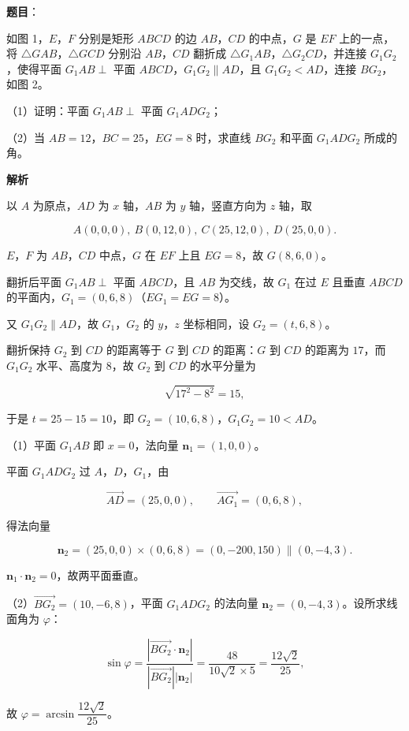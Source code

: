 \begin{answer}

\textbf{题目}：

如图 1，$E$，$F$ 分别是矩形 $ABCD$ 的边 $AB$，$CD$ 的中点，$G$ 是 $EF$ 上的一点，将 $\triangle GAB$，$\triangle GCD$ 分别沿 $AB$，$CD$ 翻折成 $\triangle G_1AB$，$\triangle G_2CD$，并连接 $G_1G_2$，使得平面 $G_1AB\perp$ 平面 $ABCD$，$G_1G_2\parallel AD$，且 $G_1G_2<AD$，连接 $BG_2$，如图 2。

（1）证明：平面 $G_1AB\perp$ 平面 $G_1ADG_2$；

（2）当 $AB=12$，$BC=25$，$EG=8$ 时，求直线 $BG_2$ 和平面 $G_1ADG_2$ 所成的角。
\nopagebreak[4]
\begin{center}\end{center}
\nopagebreak[4]
\textbf{解析}

以 $A$ 为原点，$AD$ 为 $x$ 轴，$AB$ 为 $y$ 轴，竖直方向为 $z$ 轴，取

\nopagebreak[4]
\[A(0,0,0),\ B(0,12,0),\ C(25,12,0),\ D(25,0,0).\]

$E$，$F$ 为 $AB$，$CD$ 中点，$G$ 在 $EF$ 上且 $EG=8$，故 $G(8,6,0)$。

翻折后平面 $G_1AB\perp$ 平面 $ABCD$，且 $AB$ 为交线，故 $G_1$ 在过 $E$ 且垂直 $ABCD$ 的平面内，$G_1=(0,6,8)$（$EG_1=EG=8$）。

又 $G_1G_2\parallel AD$，故 $G_1$，$G_2$ 的 $y$，$z$ 坐标相同，设 $G_2=(t,6,8)$。

翻折保持 $G_2$ 到 $CD$ 的距离等于 $G$ 到 $CD$ 的距离：$G$ 到 $CD$ 的距离为 $17$，而 $G_1G_2$ 水平、高度为 $8$，故 $G_2$ 到 $CD$ 的水平分量为

\nopagebreak[4]
\[\sqrt{17^2-8^2}=15,\]

于是 $t=25-15=10$，即 $G_2=(10,6,8)$，$G_1G_2=10<AD$。

（1）平面 $G_1AB$ 即 $x=0$，法向量 $\boldsymbol n_1=(1,0,0)$。

平面 $G_1ADG_2$ 过 $A$，$D$，$G_1$，由

\nopagebreak[4]
\[\overrightarrow{AD}=(25,0,0),\qquad \overrightarrow{AG_1}=(0,6,8),\]

得法向量

\nopagebreak[4]
\[\boldsymbol n_2=(25,0,0)\times(0,6,8)=(0,-200,150)\parallel(0,-4,3).\]

$\boldsymbol n_1\cdot\boldsymbol n_2=0$，故两平面垂直。

（2）$\overrightarrow{BG_2}=(10,-6,8)$，平面 $G_1ADG_2$ 的法向量 $\boldsymbol n_2=(0,-4,3)$。设所求线面角为 $\varphi$：

\nopagebreak[4]
\[\sin\varphi=\frac{\left|\overrightarrow{BG_2}\cdot\boldsymbol n_2\right|}{\left|\overrightarrow{BG_2}\right|\left|\boldsymbol n_2\right|}
=\frac{48}{10\sqrt2\times5}=\frac{12\sqrt2}{25},\]

故 $\varphi=\arcsin\dfrac{12\sqrt2}{25}$。


\end{answer}
